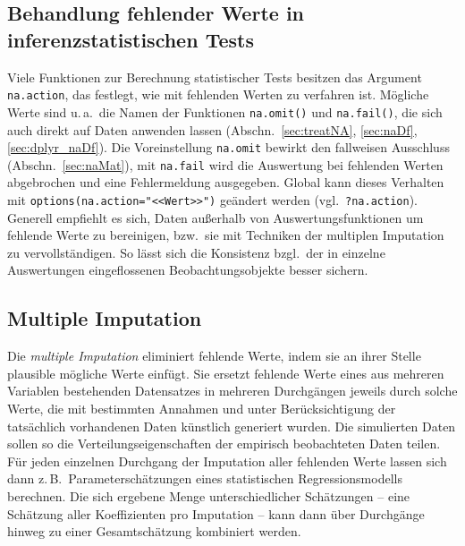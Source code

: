 \subsection{Behandlung fehlender Werte in inferenzstatistischen Tests}
\label{sec:naTests}

Viele Funktionen zur Berechnung statistischer Tests besitzen das Argument \lstinline!na.action!, das festlegt, wie mit fehlenden Werten zu verfahren ist. Mögliche Werte sind u.\,a.\ die Namen der Funktionen \lstinline!na.omit()! und \lstinline!na.fail()!, die sich auch direkt auf Daten anwenden lassen (Abschn.\ \ref{sec:treatNA}, \ref{sec:naDf}, \ref{sec:dplyr_naDf}). Die Voreinstellung \lstinline!na.omit! bewirkt den fallweisen Ausschluss (Abschn.\ \ref{sec:naMat}), mit \lstinline!na.fail! wird die Auswertung bei fehlenden Werten abgebrochen und eine Fehlermeldung ausgegeben. Global kann dieses Verhalten mit \lstinline!options(na.action="<<Wert>>")! geändert werden (vgl.\ \lstinline!?na.action!). Generell empfiehlt es sich, Daten außerhalb von Auswertungsfunktionen um fehlende Werte zu bereinigen, bzw.\ sie mit Techniken der multiplen Imputation zu vervollständigen. So lässt sich die Konsistenz bzgl.\ der in einzelne Auswertungen eingeflossenen Beobachtungsobjekte besser sichern.

\subsection{Multiple Imputation}
\label{sec:multipleImputation}

Die \emph{multiple Imputation} eliminiert fehlende Werte, indem sie an ihrer Stelle plausible mögliche Werte einfügt. Sie ersetzt fehlende Werte eines aus mehreren Variablen bestehenden Datensatzes in mehreren Durchgängen jeweils durch solche Werte, die mit bestimmten Annahmen und unter Berücksichtigung der tatsächlich vorhandenen Daten künstlich generiert wurden. Die simulierten Daten sollen so die Verteilungseigenschaften der empirisch beobachteten Daten teilen. Für jeden einzelnen Durchgang der Imputation aller fehlenden Werte lassen sich dann z.\,B.\ Parameterschätzungen eines statistischen Regressionsmodells berechnen. Die sich ergebene Menge unterschiedlicher Schätzungen -- eine Schätzung aller Koeffizienten pro Imputation -- kann dann über Durchgänge hinweg zu einer Gesamtschätzung kombiniert werden.

